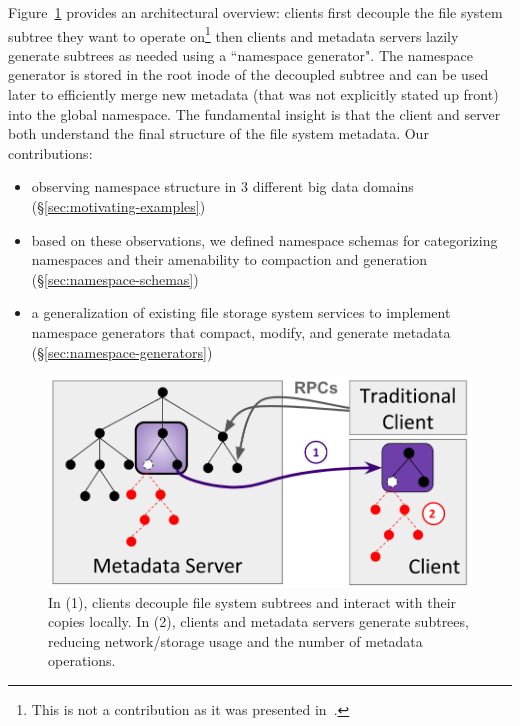 Figure~\ref{fig:intro} provides an architectural overview: clients first
decouple the file system subtree they want to operate on\footnote{This is not a
contribution as it was presented in~\cite{sevilla:ipdps18-cudele}.} then
clients and metadata servers lazily generate subtrees as needed using a
``namespace generator". The namespace generator is stored in the root inode of
the decoupled subtree and can be used later to efficiently merge new metadata
(that was not explicitly stated up front) into the global namespace.  The
fundamental insight is that the client and server both understand the final
structure of the file system metadata. Our contributions:
\vspace{-0.5em}
\begin{itemize}
  \setlength\itemsep{-0.5em}

\item observing namespace structure in 3 different big data domains
(\S\ref{sec:motivating-examples})

\item based on these observations, we defined namespace schemas for
categorizing namespaces and their amenability to compaction and generation
(\S\ref{sec:namespace-schemas})

\item a generalization of existing file storage system services to implement
namespace generators that compact, modify, and generate metadata
(\S\ref{sec:namespace-generators})
\end{itemize}

\begin{figure}[t]
  \centering
  \includegraphics[width=0.8\linewidth]{figures/intro.png}
  \caption{In (1), clients decouple file system subtrees and interact with
their copies locally. In (2), clients and metadata servers generate subtrees,
reducing network/storage usage and the number of metadata operations.
\label{fig:intro}}
\end{figure}
